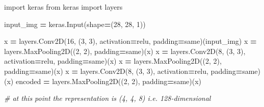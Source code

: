 \documentclass[
  a4paper,
  DIV=11,
  numbers=noendperiod]{scrreprt}
\newenvironment{Shaded}{\begin{snugshade}}{\end{snugshade}}
\newcommand{\CommentTok}[1]{\textcolor[rgb]{0.56,0.35,0.01}{\textit{#1}}}
\newcommand{\DecValTok}[1]{\textcolor[rgb]{0.00,0.00,0.81}{#1}}
\newcommand{\ImportTok}[1]{#1}
\newcommand{\NormalTok}[1]{#1}
\newcommand{\OperatorTok}[1]{\textcolor[rgb]{0.81,0.36,0.00}{\textbf{#1}}}
\newcommand{\StringTok}[1]{\textcolor[rgb]{0.31,0.60,0.02}{#1}}
\begin{document}
\begin{Shaded}
\begin{Highlighting}[numbers=left,,]

\ImportTok{import}\NormalTok{ keras}
\ImportTok{from}\NormalTok{ keras }\ImportTok{import}\NormalTok{ layers}

\NormalTok{input\_img }\OperatorTok{=}\NormalTok{ keras.Input(shape}\OperatorTok{=}\NormalTok{(}\DecValTok{28}\NormalTok{, }\DecValTok{28}\NormalTok{, }\DecValTok{1}\NormalTok{))}

\NormalTok{x }\OperatorTok{=}\NormalTok{ layers.Conv2D(}\DecValTok{16}\NormalTok{, (}\DecValTok{3}\NormalTok{, }\DecValTok{3}\NormalTok{), activation}\OperatorTok{=}\StringTok{\textquotesingle{}relu\textquotesingle{}}\NormalTok{, padding}\OperatorTok{=}\StringTok{\textquotesingle{}same\textquotesingle{}}\NormalTok{)(input\_img)}
\NormalTok{x }\OperatorTok{=}\NormalTok{ layers.MaxPooling2D((}\DecValTok{2}\NormalTok{, }\DecValTok{2}\NormalTok{), padding}\OperatorTok{=}\StringTok{\textquotesingle{}same\textquotesingle{}}\NormalTok{)(x)}
\NormalTok{x }\OperatorTok{=}\NormalTok{ layers.Conv2D(}\DecValTok{8}\NormalTok{, (}\DecValTok{3}\NormalTok{, }\DecValTok{3}\NormalTok{), activation}\OperatorTok{=}\StringTok{\textquotesingle{}relu\textquotesingle{}}\NormalTok{, padding}\OperatorTok{=}\StringTok{\textquotesingle{}same\textquotesingle{}}\NormalTok{)(x)}
\NormalTok{x }\OperatorTok{=}\NormalTok{ layers.MaxPooling2D((}\DecValTok{2}\NormalTok{, }\DecValTok{2}\NormalTok{), padding}\OperatorTok{=}\StringTok{\textquotesingle{}same\textquotesingle{}}\NormalTok{)(x)}
\NormalTok{x }\OperatorTok{=}\NormalTok{ layers.Conv2D(}\DecValTok{8}\NormalTok{, (}\DecValTok{3}\NormalTok{, }\DecValTok{3}\NormalTok{), activation}\OperatorTok{=}\StringTok{\textquotesingle{}relu\textquotesingle{}}\NormalTok{, padding}\OperatorTok{=}\StringTok{\textquotesingle{}same\textquotesingle{}}\NormalTok{)(x)}
\NormalTok{encoded }\OperatorTok{=}\NormalTok{ layers.MaxPooling2D((}\DecValTok{2}\NormalTok{, }\DecValTok{2}\NormalTok{), padding}\OperatorTok{=}\StringTok{\textquotesingle{}same\textquotesingle{}}\NormalTok{)(x)}

\CommentTok{\# at this point the representation is (4, 4, 8) i.e. 128{-}dimensional}


\end{Highlighting}
\end{Shaded}
\end{document}

